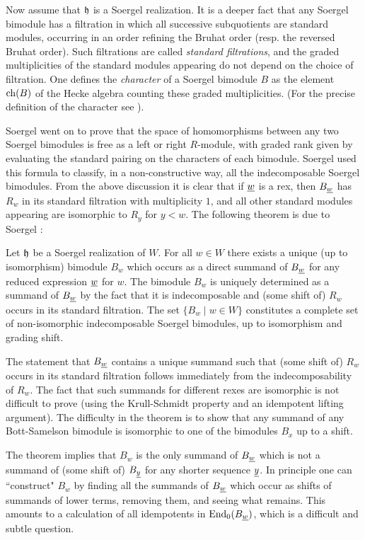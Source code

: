 Now assume that ${\mathfrak h}$ is a Soergel realization. It is a deeper fact that any Soergel bimodule has a filtration in which all successive subquotients are standard modules, occurring in an
order refining the Bruhat order (resp. the reversed Bruhat order). Such filtrations are called \emph{standard filtrations}, and the
graded multiplicities of the standard modules appearing do not depend on the choice of filtration. One defines the \emph{character} of a Soergel
bimodule $B$ as the element $\operatorname{ch}(B)$ of the Hecke algebra counting these graded multiplicities. (For the precise definition of the character see \cite[\S 5]{Soe3}).

Soergel went on to prove that the space of homomorphisms between any two Soergel bimodules is free as a left or right $R$-module, with graded rank given by evaluating the standard pairing
on the characters of each bimodule. Soergel used this formula to classify, in a non-constructive way, all the indecomposable Soergel bimodules. From the above discussion it is clear that
if $\underline{w}$ is a rex, then $B_{\underline{w}}$ has $R_w$ in its standard filtration with multiplicity $1$, and all other standard modules appearing are isomorphic to $R_y$
for $y<w$. The following theorem is due to Soergel \cite[Satz 6.14]{Soe3}:

\begin{thm} Let ${\mathfrak h}$ be a Soergel realization of $W$. For all $w \in W$ there exists a unique (up to isomorphism) bimodule $B_w$ which occurs as a direct summand of $B_{\underline{w}}$ for any reduced expression $\underline{w}$ for $w$. The bimodule $B_w$ is uniquely determined as a summand of $B_{\underline{w}}$ by the fact that it is indecomposable and (some shift of) $R_w$ occurs in its standard filtration. The set $\{ B_w \; | \; w \in W \}$ constitutes a complete set of non-isomorphic indecomposable Soergel bimodules, up to isomorphism and grading shift.\label{SoergelThm1} \end{thm}

The statement that $B_{\underline{w}}$ contains a unique summand such that (some shift of) $R_w$ occurs in its standard filtration follows immediately from the indecomposability of $R_w$. The fact that such summands for different rexes are isomorphic is not difficult to prove (using the Krull-Schmidt property and an idempotent lifting argument). The difficulty in the theorem is to show that any summand of any Bott-Samelson bimodule is isomorphic to one of the bimodules $B_x$ up to a shift.

The theorem implies that $B_w$ is the only summand of $B_{\underline{w}}$ which is not a summand of (some shift of) $B_{\underline{y}}$ for any shorter sequence $\underline{y}$. In principle one can
``construct" $B_w$ by finding all the summands of $B_{\underline{w}}$ which occur as shifts of summands of lower terms, removing them, and seeing what remains. This amounts to a calculation of
all idempotents in $\operatorname{End}_0(B_{\underline{w}})$, which is a difficult and subtle question.

